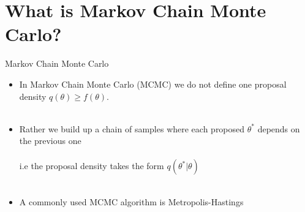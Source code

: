 \documentclass[compress]{beamer}
\begin{document}
\section{What is Markov Chain Monte Carlo?}
\label{sec-7}
\begin{frame}[label=sec-7-1]{Markov Chain Monte Carlo}
\begin{itemize}
\item In Markov Chain Monte Carlo (MCMC) we do not define one proposal density $q(\theta) \geqslant f(\theta)$.\\~\\
\item Rather we build up a \alert{chain} of samples where each proposed $\theta^*$ depends on the previous one \\~\\
 i.e the proposal density takes the form $q(\theta^* | \theta)$\\~\\
\item A commonly used MCMC algorithm is \alert{Metropolis-Hastings}
\end{itemize}
\end{frame}
\end{document}
